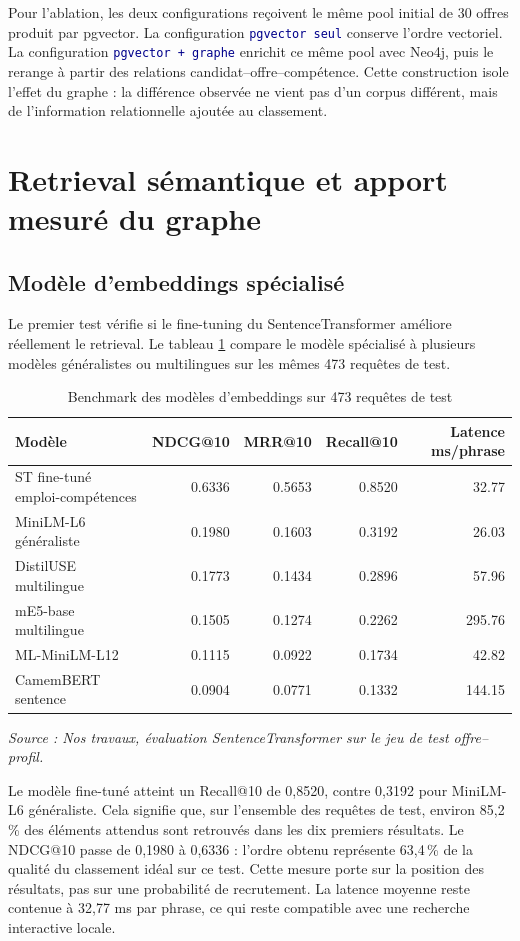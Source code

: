 \documentclass[12pt,twoside]{report}
\newcommand{\source}[1]{%
  \par\vspace{0.2\baselineskip}
  {\centering\footnotesize\itshape Source : #1\par}
}
\newcommand{\filevar}[1]{\texttt{\textcolor{darkblue}{#1}}}
\begin{document}
Pour l'ablation, les deux configurations reçoivent le même pool initial de 30 offres produit par pgvector. La configuration \filevar{pgvector seul} conserve l'ordre vectoriel. La configuration \filevar{pgvector + graphe} enrichit ce même pool avec Neo4j, puis le rerange à partir des relations candidat--offre--compétence. Cette construction isole l'effet du graphe : la différence observée ne vient pas d'un corpus différent, mais de l'information relationnelle ajoutée au classement.

\section{Retrieval sémantique et apport mesuré du graphe}

\subsection{Modèle d'embeddings spécialisé}

Le premier test vérifie si le fine-tuning du SentenceTransformer améliore réellement le retrieval. Le tableau \ref{tab:eval_embeddings} compare le modèle spécialisé à plusieurs modèles généralistes ou multilingues sur les mêmes 473 requêtes de test.

\begin{table}[H]
\centering
\caption{Benchmark des modèles d'embeddings sur 473 requêtes de test}
\label{tab:eval_embeddings}
\normalsize
\begin{tabular}{lrrrr}
\toprule
Modèle & NDCG@10 & MRR@10 & Recall@10 & Latence ms/phrase \\
\midrule
ST fine-tuné emploi-compétences & 0.6336 & 0.5653 & 0.8520 & 32.77 \\
MiniLM-L6 généraliste & 0.1980 & 0.1603 & 0.3192 & 26.03 \\
DistilUSE multilingue & 0.1773 & 0.1434 & 0.2896 & 57.96 \\
mE5-base multilingue & 0.1505 & 0.1274 & 0.2262 & 295.76 \\
ML-MiniLM-L12 & 0.1115 & 0.0922 & 0.1734 & 42.82 \\
CamemBERT sentence & 0.0904 & 0.0771 & 0.1332 & 144.15 \\
\bottomrule
\end{tabular}
\source{Nos travaux, évaluation SentenceTransformer sur le jeu de test offre--profil.}
\end{table}

Le modèle fine-tuné atteint un Recall@10 de 0,8520, contre 0,3192 pour MiniLM-L6 généraliste. Cela signifie que, sur l'ensemble des requêtes de test, environ 85,2\,\% des éléments attendus sont retrouvés dans les dix premiers résultats. Le NDCG@10 passe de 0,1980 à 0,6336 : l'ordre obtenu représente 63,4\,\% de la qualité du classement idéal sur ce test. Cette mesure porte sur la position des résultats, pas sur une probabilité de recrutement. La latence moyenne reste contenue à 32,77 ms par phrase, ce qui reste compatible avec une recherche interactive locale.
\end{document}
